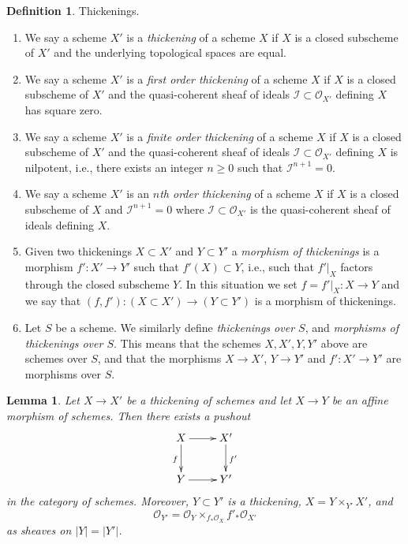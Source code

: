 \documentclass{amsart}
\theoremstyle{plain}
\newtheorem{lemma}[subsection]{Lemma}
\theoremstyle{definition}
\newtheorem{definition}[subsection]{Definition}
\theoremstyle{remark}
\numberwithin{equation}{subsection}
\begin{document}
\begin{definition}
\label{definition-thickening}
Thickenings.
\begin{enumerate}
\item We say a scheme $X'$ is a {\it thickening} of a scheme $X$ if
$X$ is a closed subscheme of $X'$ and the underlying topological spaces
are equal.
\item We say a scheme $X'$ is a {\it first order thickening} of a scheme $X$ if
$X$ is a closed subscheme of $X'$ and the quasi-coherent sheaf of ideals
$\mathcal{I} \subset \mathcal{O}_{X'}$ defining $X$ has square zero.
\item We say a scheme $X'$ is a {\it finite order thickening} of a scheme $X$
if $X$ is a closed subscheme of $X'$ and the quasi-coherent sheaf of ideals
$\mathcal{I} \subset \mathcal{O}_{X'}$ defining $X$ is nilpotent, i.e.,
there exists an integer $n \geq 0$ such that $\mathcal{I}^{n + 1} = 0$.
\item We say a scheme $X'$ is an {\it $n$th order thickening} of a scheme $X$
if $X$ is a closed subscheme of $X$ and $\mathcal{I}^{n + 1} = 0$
where $\mathcal{I} \subset \mathcal{O}_{X'}$ is the
quasi-coherent sheaf of ideals defining $X$.
\item Given two thickenings $X \subset X'$ and $Y \subset Y'$ a
{\it morphism of thickenings} is a morphism $f' : X' \to Y'$ such that
$f'(X) \subset Y$, i.e., such that $f'|_X$ factors through the closed
subscheme $Y$. In this situation we set $f = f'|_X : X \to Y$ and we say
that $(f, f') : (X \subset X') \to (Y \subset Y')$ is a morphism of
thickenings.
\item Let $S$ be a scheme. We similarly define {\it thickenings over $S$}, and
{\it morphisms of thickenings over $S$}. This means that the schemes
$X, X', Y, Y'$ above are schemes over $S$, and that the morphisms
$X \to X'$, $Y \to Y'$ and $f' : X' \to Y'$ are morphisms over $S$.
\end{enumerate}
\end{definition}

\begin{lemma}
\label{lemma-pushout-along-thickening}
Let $X \to X'$ be a thickening of schemes and let $X \to Y$ be an affine
morphism of schemes. Then there exists a pushout
$$
\xymatrix{
X \ar[r] \ar[d]_f
&
X' \ar[d]^{f'}
\\
Y \ar[r]
&
Y'
}
$$
in the category of schemes. Moreover, $Y \subset Y'$ is a
thickening, $X = Y \times_{Y'} X'$, and
$$
\mathcal{O}_{Y'} = \mathcal{O}_Y \times_{f_*\mathcal{O}_X} f'_*\mathcal{O}_{X'}
$$
as sheaves on $|Y| = |Y'|$.
\end{lemma}
\end{document}
